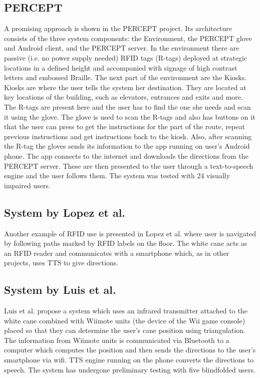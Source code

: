 \subsection{PERCEPT}
A promising approach is shown in the PERCEPT \cite{percept} project. Its architecture consists of the three system components: the Environment, the PERCEPT glove and Android client, and
the PERCEPT server. In the environment there are passive (i.e. no power supply needed) RFID tags (R-tags) deployed at strategic locations in a defined height and accompanied with signage of high contrast letters and embossed Braille. The next part of the environment are the Kiosks. Kiosks are where the user tells the system her destination. They are located at key locations of the building, such as elevators, entrances and exits and more. The R-tags are present here and the user has to find the one she needs and scan it using the glove.
The glove is used to scan the R-tags and also has buttons on it that the user can press to get the instructions for the part of the route, repeat previous instructions and get instructions back to the kiosk. Also, after scanning the R-tag the gloves sends its information to the app running on user's Android phone. The app connects to the internet and downloads the directions from the PERCEPT server. These are then presented to the user through a text-to-speech engine and the user follows them. The system was tested with 24 visually impaired users.

\subsection{System by Lopez et al.}
Another example of RFID use is presented in Lopez et al. \cite{lopez} where user is navigated by following paths marked by RFID labels on the floor. The white cane acts as an RFID reader and communicates with a smartphone which, as in other projects, uses TTS to give directions.

\subsection{System by Luis et al.}
Luis et al.\cite{luis} propose a system which uses an infrared transmitter attached to the white cane combined with Wiimote units (the device of the Wii game console) placed so that they can determine the user's cane position using triangulation. The information from Wiimote units is communicated via Bluetooth to a computer which computes the position and then sends the directions to the user's smartphone via wifi. TTS engine running on the phone converts the directions to speech. The system has undergone preliminary testing with five blindfolded users.


